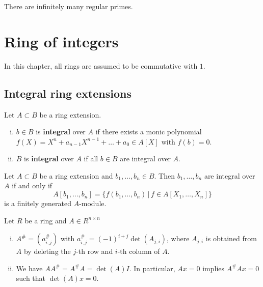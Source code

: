  \begin{conjecture*}There are infinitely many regular primes.
 \end{conjecture*}





\chapter{Ring of integers}

In this chapter, all rings are assumed to be commutative with $1$.


\section{Integral ring extensions}

\begin{defi}
	Let $A\subset B$ be a ring extension.
\begin{enumerate}[(i)]
\item $b \in B$ is \textbf{integral } over $A$ if there exists a monic polynomial
$f(X)=X^n+a_{n-1}X^{n-1}+\dots + a_0 \in A[X]$ with $f(b)=0$.
\item $B$ is \textbf{integral } over $A$ if all $b\in B$ are integral over $A$.
\end{enumerate}
\end{defi}

\begin{Prop}
	Let $A\subset B$ be a ring extension and $b_1,\dots,b_n \in B$. Then
	$b_1,\dots, b_n$ are integral over $A$ if and only if 
	\[ A[b_1,\dots, b_n] = \{ f(b_1,\dots,b_n) \, | \, f \in A[X_1,\dots, X_n]
	\}
	\]
	is a finitely generated $A$-module.
\end{Prop}

\begin{remin}
Let $R$ be a ring and $A \in R^{n \times n}$
\begin{enumerate}[(i)]
\item $A^\# = (a_{i,j}^\#)$ with $a_{i,j}^\# = (-1)^{i+j} \det(A_{j,i})$,
	where $A_{j,i}$ is obtained from $A$ by deleting the $j$-th row and $i$-th column of $A$.
\item We have $AA^\# = A^\#A = \det(A) I$.
In particular, $Ax=0$ implies $A^\#Ax=0$ such that $\det(A)x = 0$.
\end{enumerate}
\end{remin}

